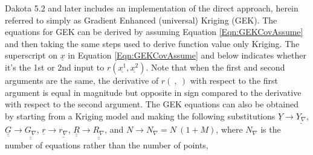 Dakota 5.2 and later includes an implementation of the direct approach,
herein referred to simply as Gradient Enhanced (universal) Kriging (GEK).  
The equations for GEK can be derived by assuming Equation 
\ref{Eqn:GEKCovAssume} and then taking the same steps used to derive 
function value only Kriging.  The superscript on $\underline{x}$ 
in Equation \ref{Eqn:GEKCovAssume} and below indicates whether it's 
the 1st or 2nd input to $r\left(\underline{x^1},\underline{x^2}\right)$.  
Note that when the first and second arguments are the same, the derivative 
of $r\left(\ ,\ \right)$ with respect to the first argument is equal in 
magnitude but opposite in sign compared to the derivative with respect to 
the second argument.  The GEK equations can also be obtained by starting 
from a Kriging model and making the following substitutions
$\underline{Y}\rightarrow\underline{Y_{\nabla}}$, 
$\underline{\underline{G}}\rightarrow\underline{\underline{G_{\nabla}}}$,
$\underline{r}\rightarrow\underline{r_{\nabla}}$,
$\underline{\underline{R}}\rightarrow\underline{\underline{R_{\nabla}}}$,
and $N\rightarrow N_{\nabla}=N\ (1+M)$, where $N_{\nabla}$ is the number 
of equations rather than the number of points,
